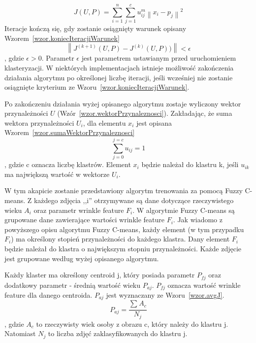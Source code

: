 \documentclass[a4paper,twoside,12pt]{book}
\begin{document}
    \large
    \begin{equation}
        J(U,P)= \sum_{i=1}^{n}\sum_{j=1}^{c}u_{ij}^{m}\left \| x_{i}-p_{j} \right \|^{2}
        \label{wzor.kryteriumFCM}
    \end{equation}
    \normalsize
    Iteracje kończą się, gdy zostanie osiągnięty warunek opisany Wzorem~\ref{wzor.koniecIteracjiWarunek}
    \large
    \begin{equation}
        \left \| J^{(k+1)}(U,P) - J^{(k)}(U,P)) \right \| < \epsilon
        \label{wzor.koniecIteracjiWarunek}
    \end{equation}
    \normalsize
    , gdzie $\epsilon > 0$. Parametr $\epsilon$ jest parametrem ustawianym przed uruchomieniem klasteryzacji.
    W niektórych implementacjach istnieje możliwość zakończenia działania algorytmu po określonej liczbę iteracji,
    jeśli wcześniej nie zostanie osiągnięte kryterium ze Wzoru~\ref{wzor.koniecIteracjiWarunek}.

    Po zakończeniu działania wyżej opisanego algorytmu zostaje wyliczony wektor przynależności $U$
    (Wzór~\ref{wzor.wektorPrzynaleznosci}).
    Zakładając, że suma wektora przynależności $U_{i}$, dla elementu $x_{i}$ jest opisana
    Wzorem~\ref{wzor.sumaWektorPrzynaleznosci}
    \large
    \begin{equation}
        \sum_{j=0}^{j=c} u_{ij}=1
        \label{wzor.sumaWektorPrzynaleznosci}
    \end{equation}
    \normalsize
    , gdzie c oznacza liczbę klastrów.
    Element $x_{i}$ będzie należał do klastru k, jeśli $u_{ik}$ ma największą wartość w wektorze $U_{i}$.

    W tym akapicie zostanie przedstawiony algorytm trenowania za pomocą Fuzzy C-means.
    Z każdego zdjęcia ,,i'' otrzymywane są dane dotyczące rzeczywistego wieku $A_{i}$ oraz parametr wrinkle feature
    $F_{i}$.
    W algorytmie Fuzzy C-means są grupowane dane zawierające wartości wrinkle feature $F_{i}$.
    Jak wiadomo z powyższego opisu algorytmu Fuzzy C-means, każdy element (w tym przypadku $F_{i}$) ma określony stopień
    przynależności do każdego klastra. Dany element $F_{i}$ będzie należał do klastra o największym stopniu
    przynależności. Każde zdjęcie jest grupowane według wyżej opisanego algorytmu.

    Każdy klaster ma określony centroid j, który posiada parametr $P_{fj}$  oraz dodatkowy parametr - średnią
    wartość wieku $P_{aj}$. $P_{fj}$ oznacza wartość wrinkle feature dla danego centroida.
    $P_{aj}$ jest wyznaczany ze Wzoru~\ref{wzor.avgJ}.
    \large
    \begin{equation}
        P_{aj}=\frac{\sum_{}^{}A_{c}}{N_{j}}
        \label{wzor.avgJ}
    \end{equation}
    \normalsize
    , gdzie $A_{c}$ to rzeczywisty wiek osoby z obrazu c, który należy do klastru j.
    Natomiast $N_{j}$ to liczba zdjęć zaklasyfikowanych do klastru j.
\end{document}
